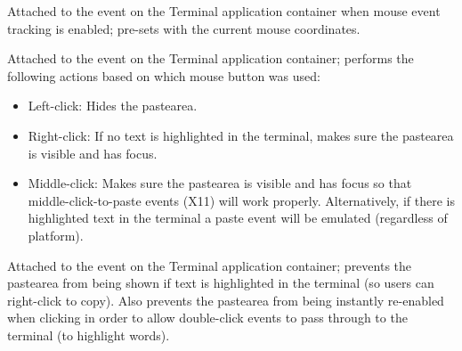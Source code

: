 \documentclass[letterpaper,10pt,openany]{sphinxmanual}
\begin{document}
\begin{fulllineitems}
\begin{fulllineitems}
\end{fulllineitems}



\begin{fulllineitems}
Attached to the  event on the Terminal application container when mouse event tracking is enabled; pre-sets  with the current mouse coordinates.

\end{fulllineitems}



\begin{fulllineitems}
\label{Applications/terminal/js_terminal_input:GateOne.Terminal.Input.onMouseDown}
Attached to the  event on the Terminal application container; performs the following actions based on which mouse button was used:
\begin{itemize}
\item {} 
Left-click: Hides the pastearea.

\item {} 
Right-click: If no text is highlighted in the terminal, makes sure the pastearea is visible and has focus.

\item {} 
Middle-click: Makes sure the pastearea is visible and has focus so that middle-click-to-paste events (X11) will work properly.  Alternatively, if there is highlighted text in the terminal a paste event will be emulated (regardless of platform).

\end{itemize}

\end{fulllineitems}



\begin{fulllineitems}
\label{Applications/terminal/js_terminal_input:GateOne.Terminal.Input.onMouseUp}
Attached to the  event on the Terminal application container; prevents the pastearea from being shown if text is highlighted in the terminal (so users can right-click to copy).  Also prevents the pastearea from being instantly re-enabled when clicking in order to allow double-click events to pass through to the terminal (to highlight words).


\end{fulllineitems}
\end{fulllineitems}
\end{document}
